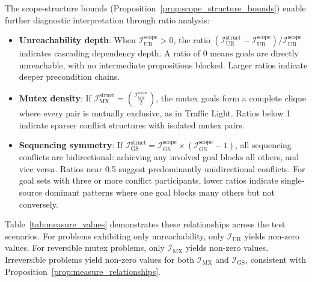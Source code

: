 The scope-structure bounds (Proposition~\ref{prop:scope_structure_bounds}) enable further diagnostic interpretation through ratio analysis:

\begin{itemize}
    \item \textbf{Unreachability depth}: When $\mathcal{I}^{\text{scope}}_{\text{UR}} > 0$, the ratio $(\mathcal{I}^{\text{struct}}_{\text{UR}} - \mathcal{I}^{\text{scope}}_{\text{UR}}) / \mathcal{I}^{\text{scope}}_{\text{UR}}$ indicates cascading dependency depth. A ratio of 0 means goals are directly unreachable, with no intermediate propositions blocked. Larger ratios indicate deeper precondition chains.

    \item \textbf{Mutex density}: If $\mathcal{I}^{\text{struct}}_{\text{MX}} = \binom{\mathcal{I}^{\text{scope}}_{\text{MX}}}{2}$, the mutex goals form a complete clique where every pair is mutually exclusive, as in Traffic Light. Ratios below 1 indicate sparser conflict structures with isolated mutex pairs.

    \item \textbf{Sequencing symmetry}: If $\mathcal{I}^{\text{struct}}_{\text{GS}} = \mathcal{I}^{\text{scope}}_{\text{GS}} \times (\mathcal{I}^{\text{scope}}_{\text{GS}} - 1)$, all sequencing conflicts are bidirectional: achieving any involved goal blocks all others, and vice versa. Ratios near 0.5 suggest predominantly unidirectional conflicts. For goal sets with three or more conflict participants, lower ratios indicate single-source dominant patterns where one goal blocks many others but not conversely.
\end{itemize}

Table~\ref{tab:measure_values} demonstrates these relationships across the test scenarios. For problems exhibiting only unreachability, only $\mathcal{I}_{\text{UR}}$ yields non-zero values. For reversible mutex problems, only $\mathcal{I}_{\text{MX}}$ yields non-zero values. Irreversible problems yield non-zero values for both $\mathcal{I}_{\text{MX}}$ and $\mathcal{I}_{\text{GS}}$, consistent with Proposition~\ref{prop:measure_relationships}.

